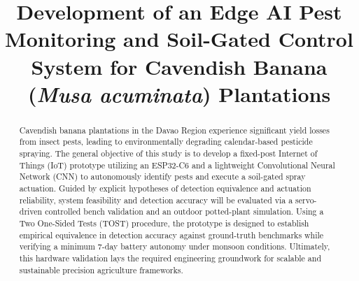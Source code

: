 \documentclass[conference]{IEEEtran}
\begin{document}
\title{Development of an Edge AI Pest Monitoring and Soil-Gated Control System for Cavendish Banana (\textit{Musa acuminata}) Plantations}

\author{
\and
{}
\and
{}
}

\maketitle

\thispagestyle{plain}
\pagestyle{plain}

\begin{abstract}
Cavendish banana plantations in the Davao Region experience significant yield losses from insect pests, leading to environmentally degrading calendar-based pesticide spraying. The general objective of this study is to develop a fixed-post Internet of Things (IoT) prototype utilizing an ESP32-C6 and a lightweight Convolutional Neural Network (CNN) to autonomously identify pests and execute a soil-gated spray actuation. Guided by explicit hypotheses of detection equivalence and actuation reliability, system feasibility and detection accuracy will be evaluated via a servo-driven controlled bench validation and an outdoor potted-plant simulation. Using a Two One-Sided Tests (TOST) procedure, the prototype is designed to establish empirical equivalence in detection accuracy against ground-truth benchmarks while verifying a minimum 7-day battery autonomy under monsoon conditions. Ultimately, this hardware validation lays the required engineering groundwork for scalable and sustainable precision agriculture frameworks.
\end{abstract}
\end{document}
